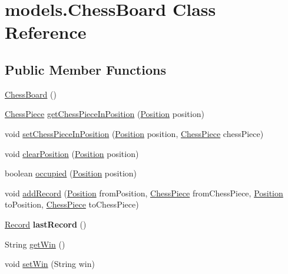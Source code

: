 \hypertarget{classmodels_1_1_chess_board}{\section{models.\+Chess\+Board Class Reference}
\label{classmodels_1_1_chess_board}
}
\subsection*{Public Member Functions}
\begin{DoxyCompactItemize}
\item 
\hyperlink{classmodels_1_1_chess_board_a4242ebe32dd357bd7d44b70b51eb4bf1}{Chess\+Board} ()
\item 
\hyperlink{classchess_pieces_1_1_chess_piece}{Chess\+Piece} \hyperlink{classmodels_1_1_chess_board_ab4160abcbb58f4195aa95f49263825dd}{get\+Chess\+Piece\+In\+Position} (\hyperlink{classmodels_1_1_position}{Position} position)
\item 
void \hyperlink{classmodels_1_1_chess_board_a17e3a22dfd4e07066e8751872a06b08a}{set\+Chess\+Piece\+In\+Position} (\hyperlink{classmodels_1_1_position}{Position} position, \hyperlink{classchess_pieces_1_1_chess_piece}{Chess\+Piece} chess\+Piece)
\item 
void \hyperlink{classmodels_1_1_chess_board_ab6fe2c2acb8db64021d646ffb76cc679}{clear\+Position} (\hyperlink{classmodels_1_1_position}{Position} position)
\item 
boolean \hyperlink{classmodels_1_1_chess_board_a8db97c5d6d0b15f42d7aa06054c2023f}{occupied} (\hyperlink{classmodels_1_1_position}{Position} position)
\item 
void \hyperlink{classmodels_1_1_chess_board_a0c6d29f835f288a3107103a9f33ce016}{add\+Record} (\hyperlink{classmodels_1_1_position}{Position} from\+Position, \hyperlink{classchess_pieces_1_1_chess_piece}{Chess\+Piece} from\+Chess\+Piece, \hyperlink{classmodels_1_1_position}{Position} to\+Position, \hyperlink{classchess_pieces_1_1_chess_piece}{Chess\+Piece} to\+Chess\+Piece)
\item 
\hypertarget{classmodels_1_1_chess_board_a78144a4dab1e10b9c2f75834650e224f}{\hyperlink{classmodels_1_1_record}{Record} {\bfseries last\+Record} ()}\label{classmodels_1_1_chess_board_a78144a4dab1e10b9c2f75834650e224f}

\item 
String \hyperlink{classmodels_1_1_chess_board_a7237577f7cc1880eee35f1b1ed29b762}{get\+Win} ()
\item 
void \hyperlink{classmodels_1_1_chess_board_a432547694019772c4aeee24c4e3af839}{set\+Win} (String win)
\end{DoxyCompactItemize}


